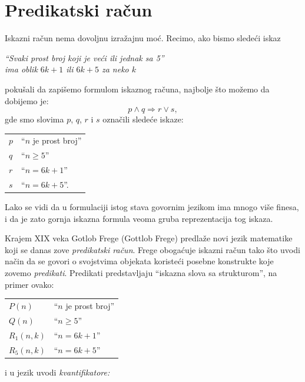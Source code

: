\def\Consist{\mathrm{Con}}
\chapter{Predikatski ra\v cun}

Iskazni ra\v cun nema dovoljnu izra\v zajnu mo\'c. Recimo, ako bismo slede\'ci iskaz
\begin{center}
  \textit{\enquote{Svaki prost broj koji je ve\'ci ili jednak sa 5}\\
  \textit{ima oblik $6k + 1$ ili $6k + 5$ za neko $k$}}
\end{center}
poku\v sali da zapi\v semo formulom iskaznog ra\v cuna, najbolje \v sto mo\v zemo da dobijemo je:
$$
  p \land q \Rightarrow r \lor s,
$$
gde smo slovima $p$, $q$, $r$ i $s$ ozna\v cili slede\'ce iskaze:

\begin{tabular}{l@{\quad$\leadsto$\quad}l}
  $p$ & \enquote{$n$ je prost broj}\\
  $q$ & \enquote{$n \ge 5$}\\
  $r$ & \enquote{$n = 6k + 1$}\\
  $s$ & \enquote{$n = 6k + 5$}.
\end{tabular}

\noindent
Lako se vidi da u formulaciji istog stava govornim jezikom ima mnogo vi\v se finesa, i da je zato
gornja iskazna formula veoma gruba reprezentacija tog iskaza.

Krajem XIX veka Gotlob Frege (Gottlob Frege) predla\v ze novi jezik matematike koji se danas zove \emph{predikatski ra\v cun}.
Frege oboga\'cuje iskazni ra\v cun tako \v sto uvodi na\v cin da se govori o svojstvima objekata
koriste\'ci posebne konstrukte koje zovemo \emph{predikati}. Predikati predstavljaju \enquote{iskazna slova sa strukturom},
na primer ovako:

\medskip

\begin{tabular}{l@{\quad$\leadsto$\quad}l}
  $P(n)$ & \enquote{$n$ je prost broj}\\
  $Q(n)$ & \enquote{$n \ge 5$}\\
  $R_1(n, k)$ & \enquote{$n = 6k + 1$}\\
  $R_5(n, k)$ & \enquote{$n = 6k + 5$}
\end{tabular}

\medskip

\noindent
i u jezik uvodi \emph{kvantifikatore:}

\medskip

